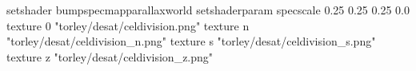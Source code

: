 setshader bumpspecmapparallaxworld
setshaderparam specscale 0.25 0.25 0.25 0.0
texture 0 "torley/desat/celdivision.png"
texture n "torley/desat/celdivision_n.png"
texture s "torley/desat/celdivision_s.png"
texture z "torley/desat/celdivision_z.png"

